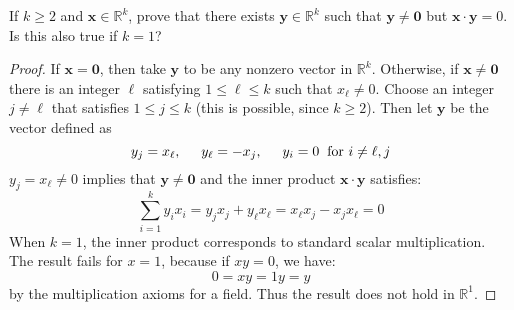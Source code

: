\documentclass[12pt]{article}
\newenvironment{problem}[2][Problem]{\begin{trivlist}
\item[\hskip \labelsep {\bfseries #1}\hskip \labelsep {\bfseries #2.}]}{\end{trivlist}}
\begin{document}
\begin{problem}{17}

\end{problem}
\begin{problem}{18}
If $k \geq 2$ and $\mathbf{x} \in \mathbb{R}^k$, prove that there exists $\mathbf{y} \in \mathbb{R}^k$ such that $\mathbf{y} \neq \mathbf{0}$ but $\mathbf{x}\cdot \mathbf{y} = 0$.  Is this also true if $k = 1$?
\end{problem}
\begin{proof}
If $\mathbf{x} = \mathbf{0}$, then take $\mathbf{y}$ to be any nonzero vector in $\mathbb{R}^k$.  Otherwise, if $\mathbf{x} \neq \mathbf{0}$ there is an integer $\ell$ satisfying $1\leq \ell \leq k$ such that $x_{\ell} \neq 0$.  Choose an integer $j \neq \ell$ that satisfies $1\leq j \leq k$ (this is possible, since $k \geq 2$).  Then let $\mathbf{y}$ be the vector defined as
\begin{equation}
y_j = x_\ell, \hspace{5mm} y_\ell = - x_j, \hspace{5mm} y_i = 0 \hspace{2mm} \text{for} \  i\neq \ell,j
\end{equation}
$y_j = x_\ell \neq 0$ implies that $\mathbf{y} \neq \mathbf{0}$ and the inner product $\mathbf{x} \cdot \mathbf{y}$ satisfies:
\begin{equation}
\sum_{i = 1}^k y_i x_i = y_j x_j + y_\ell x_\ell = x_\ell x_j - x_j x_\ell = 0
\end{equation}
When $k = 1$, the inner product corresponds to standard scalar multiplication.  The result fails for $x = 1$, because if $xy = 0$, we have:
\begin{equation}
0 = xy = 1y = y
\end{equation}
by the multiplication axioms for a field.  Thus the result does not hold in $\mathbb{R}^1$.
\end{proof}
\begin{problem}{19}

\end{problem}
\begin{problem}{20}

\end{problem}
\end{document}
